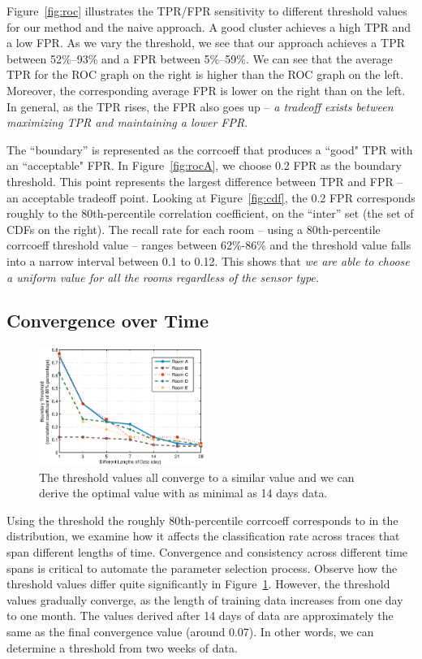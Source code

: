 Figure~\ref{fig:roc} illustrates the TPR/FPR sensitivity to different threshold values for our method and the naive approach. A good cluster achieves a high TPR and a low FPR. 
As we vary the threshold, we see that our approach 
achieves a TPR between 52\%--93\% and a FPR between 5\%--59\%.  %
We can see that the average TPR for the ROC graph on the right is higher than the 
ROC graph on the left.  Moreover, the corresponding average FPR is lower on the right than on the left.
In general, as the TPR rises, the FPR also goes up -- \emph{a tradeoff exists between maximizing TPR and maintaining a lower FPR}.


 The ``boundary'' is represented as the corrcoeff that produces a ``good" TPR with an ``acceptable" FPR.  In Figure~\ref{fig:rocA}, 
  we choose 0.2 FPR as the boundary threshold.  This point represents the largest difference between TPR and FPR -- an acceptable tradeoff point. 
Looking at Figure~\ref{fig:cdf}, the 0.2 FPR corresponds roughly to the 80th-percentile correlation coefficient, on the ``inter''
set (the set of CDFs on the right).
  The recall rate for each room -- using a 80th-percentile corrcoeff threshold value -- ranges between 62\%-86\% and the 
  threshold value falls into a narrow interval between 0.1 to 0.12. This shows that \emph{we are able to choose a uniform value 
  for all the rooms regardless of the sensor type.}

\subsection{Convergence over Time}
\begin{figure}[h!]
\centering
	\includegraphics[width=0.48\textwidth]{figs/lengtheffect.eps}
\caption{The threshold values all converge to a similar value and we can derive the optimal value with as minimal as 14 days data.}
\label{fig:leneff}
\end{figure}

Using the threshold the roughly 80th-percentile corrcoeff corresponds to in the distribution, we examine how it affects the classification rate across traces
that span different lengths of time.  Convergence and consistency across different time spans is critical to automate the parameter selection
process.
Observe how the  threshold values differ quite significantly in Figure~\ref{fig:leneff}.  However, 
the threshold values 
gradually converge, as the length of training data increases from one day to one month.  The values derived after 14 days of data
are approximately the same as the final convergence value (around 0.07).  In other words, we can determine a threshold from two weeks of data.


